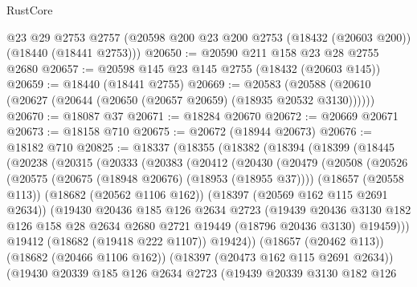 \begin{lexlean}{RustCore}
\begin{coremodule}
    @23
    @29
    @2753
    @2757
    (@20598 @200 @23 @200 @2753 (@18432 (@20603 @200)) (@18440 (@18441 @2753)))
@20650 := @20590 @211 @158 @23 @28 @2755 @2680
@20657 := @20598 @145 @23 @145 @2755 (@18432 (@20603 @145))
@20659 := @18440 (@18441 @2755)
@20669 := @20583 (@20588 (@20610 (@20627 (@20644 (@20650 (@20657 @20659) (@18935 @20532 @3130))))))
@20670 := @18087 @37
@20671 := @18284 @20670
@20672 := @20669 @20671
@20673 := @18158 @710
@20675 := @20672 (@18944 @20673)
@20676 := @18182 @710
@20825 := @18337
    (@18355
      (@18382
        (@18394
          (@18399
            (@18445
              (@20238
                (@20315
                  (@20333
                    (@20383
                      (@20412
                        (@20430
                          (@20479
                            (@20508
                              (@20526
                                (@20575 (@20675 (@18948 @20676) (@18953 (@18955 @37))))
                                (@18657 (@20558 @113))
                                (@18682 (@20562 @1106 @162))
                                (@18397 (@20569 @162 @115 @2691 @2634))
                                (@19430
                                  @20436
                                  @185
                                  @126
                                  @2634
                                  @2723
                                  (@19439
                                    @20436
                                    @3130
                                    @182
                                    @126
                                    @158
                                    @28
                                    @2634
                                    @2680
                                    @2721
                                    @19449
                                    (@18796 @20436 @3130)
                                    @19459)))
                              @19412
                              (@18682 (@19418 @222 @1107))
                              @19424))
                          (@18657 (@20462 @113))
                          (@18682 (@20466 @1106 @162))
                          (@18397 (@20473 @162 @115 @2691 @2634))
                          (@19430
                            @20339
                            @185
                            @126
                            @2634
                            @2723
                            (@19439
                              @20339
                              @3130
                              @182
                              @126

\end{coremodule}
\end{lexlean}
